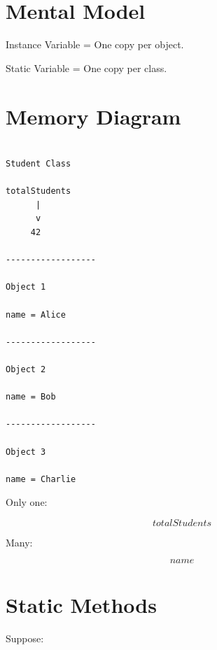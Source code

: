 \documentclass[11pt,a4paper]{book}
\begin{document}
\section{Mental Model}

\begin{mentalmodel}

Instance Variable = One copy per object.


Static Variable = One copy per class.

\end{mentalmodel}


\section{Memory Diagram}

\begin{verbatim}

Student Class

totalStudents
      |
      v
     42

------------------

Object 1

name = Alice

------------------

Object 2

name = Bob

------------------

Object 3

name = Charlie

\end{verbatim}


Only one:

\[
totalStudents
\]


Many:

\[
name
\]


\section{Static Methods}

Suppose:
\end{document}
